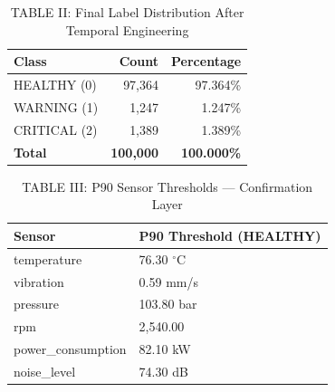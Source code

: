 \documentclass[conference]{IEEEtran}
\begin{document}
\begin{table}[htbp]
\caption{TABLE II: Final Label Distribution After Temporal Engineering}
\centering
\begin{tabular}{lrr}
\hline
\textbf{Class} & \textbf{Count} & \textbf{Percentage} \\
\hline
HEALTHY (0) & 97,364 & 97.364\% \\
WARNING (1) & 1,247 & 1.247\% \\
CRITICAL (2) & 1,389 & 1.389\% \\
\hline
\textbf{Total} & \textbf{100,000} & \textbf{100.000\%} \\
\hline
\end{tabular}
\label{tab:label_dist}
\end{table}

\begin{table}[htbp]
\caption{TABLE III: P90 Sensor Thresholds — Confirmation Layer}
\centering
\begin{tabular}{ll}
\hline
\textbf{Sensor} & \textbf{P90 Threshold (HEALTHY)} \\
\hline
temperature & 76.30 $^\circ$C \\
vibration & 0.59 mm/s \\
pressure & 103.80 bar \\
rpm & 2,540.00 \\
power\_consumption & 82.10 kW \\
noise\_level & 74.30 dB \\
\hline
\end{tabular}
\label{tab:p90}
\end{table}

\end{document}
